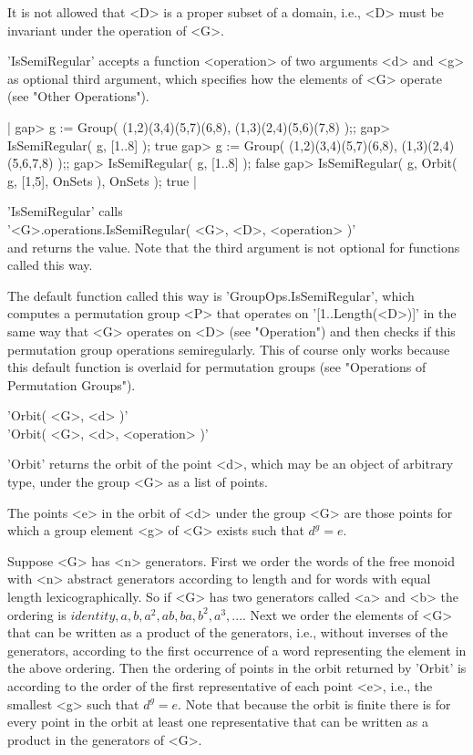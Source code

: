 It is not allowed that <D> is a proper subset of a domain, i.e., <D> must
be invariant under the operation of <G>.

'IsSemiRegular' accepts a function <operation> of two arguments  <d>  and
<g> as  optional third argument,  which specifies how the elements of <G>
operate (see "Other Operations").

|    gap> g := Group( (1,2)(3,4)(5,7)(6,8), (1,3)(2,4)(5,6)(7,8) );;
    gap> IsSemiRegular( g, [1..8] );
    true
    gap> g := Group( (1,2)(3,4)(5,7)(6,8), (1,3)(2,4)(5,6,7,8) );;
    gap> IsSemiRegular( g, [1..8] );
    false
    gap> IsSemiRegular( g, Orbit( g, [1,5], OnSets ), OnSets );
    true |

'IsSemiRegular' calls \\
'<G>.operations.IsSemiRegular( <G>, <D>, <operation> )' \\
and returns the  value.  Note that the third argument is not optional for
functions called this way.

The  default  function called this way is 'GroupOps.IsSemiRegular', which
computes  a permutation group <P> that operates on  '[1..Length(<D>)]' in
the  same way  that <G> operates on <D> (see "Operation") and then checks
if this permutation group operations semiregularly.  This of course  only
works because this  default  function is overlaid  for permutation groups
(see "Operations of Permutation Groups").


'Orbit( <G>, <d> )' \\
'Orbit( <G>, <d>, <operation> )'

'Orbit' returns the orbit  of the point <d>,  which  may be an  object of
arbitrary type, under the group <G> as a list of points.

The points <e> in the orbit of <d>  under the group  <G> are those points
for which a group element <g> of <G> exists such that $d^g = e$.

Suppose <G> has <n>  generators.  First we   order the words of the  free
monoid  with <n> abstract  generators according  to  length and for words
with equal length lexicographically.  So if <G> has two generators called
<a> and <b> the ordering is $identity, a, b, a^2, ab, ba, b^2, a^3, ...$.
Next we order the elements of <G> that can be written as a product of the
generators, i.e.,  without inverses of  the  generators, according to the
first occurrence  of  a word    representing the  element   in the  above
ordering.   Then the ordering of points  in the orbit returned by 'Orbit'
is according to the order of the first  representative of each point <e>,
i.e., the smallest <g> such that $d^g =  e$.  Note that because the orbit
is   finite  there is   for every   point in   the   orbit at   least one
representative that can be written as a product in the generators of <G>.

